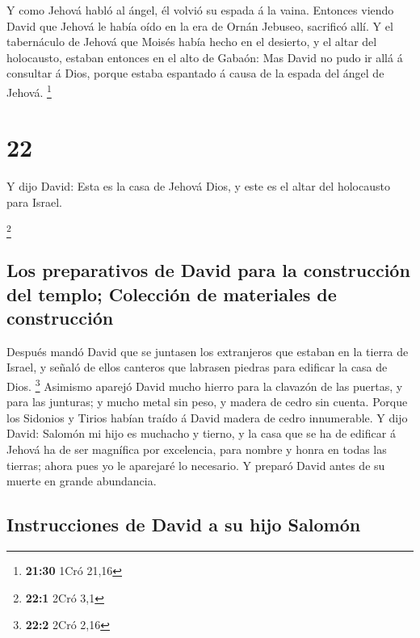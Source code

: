  Y como Jehová habló al ángel, él volvió su espada á la
vaina.  Entonces viendo David que Jehová le había oído en
la era de Ornán Jebuseo, sacrificó allí.  Y el
tabernáculo de Jehová que Moisés había hecho en el desierto, y el altar
del holocausto, estaban entonces en el alto de Gabaón: Mas David no pudo
ir allá á consultar á Dios, porque estaba espantado á causa de la espada
del ángel de Jehová. \footnote{\textbf{21:30} 1Cró 21,16}

\hypertarget{section-21}{%
\section{22}\label{section-21}}

 Y dijo David: Esta es la casa de Jehová Dios, y este es
el altar del holocausto para Israel.

\footnote{\textbf{22:1} 2Cró 3,1}

\hypertarget{los-preparativos-de-david-para-la-construcciuxf3n-del-templo-colecciuxf3n-de-materiales-de-construcciuxf3n}{%
\subsection{Los preparativos de David para la construcción del templo;
Colección de materiales de
construcción}\label{los-preparativos-de-david-para-la-construcciuxf3n-del-templo-colecciuxf3n-de-materiales-de-construcciuxf3n}}

 Después mandó David que se juntasen los extranjeros que
estaban en la tierra de Israel, y señaló de ellos canteros que labrasen
piedras para edificar la casa de Dios. \footnote{\textbf{22:2} 2Cró 2,16}
 Asimismo aparejó David mucho hierro para la clavazón de
las puertas, y para las junturas; y mucho metal sin peso, y madera de
cedro sin cuenta.  Porque los Sidonios y Tirios habían
traído á David madera de cedro innumerable.  Y dijo David:
Salomón mi hijo es muchacho y tierno, y la casa que se ha de edificar á
Jehová ha de ser magnífica por excelencia, para nombre y honra en todas
las tierras; ahora pues yo le aparejaré lo necesario. Y preparó David
antes de su muerte en grande abundancia.

\hypertarget{instrucciones-de-david-a-su-hijo-salomuxf3n}{%
\subsection{Instrucciones de David a su hijo
Salomón}\label{instrucciones-de-david-a-su-hijo-salomuxf3n}}

